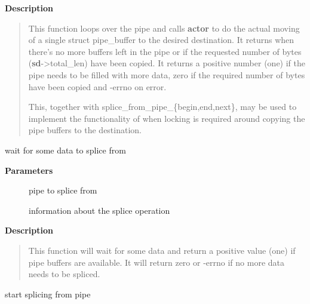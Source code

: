\documentclass[a4paper,8pt,english]{sphinxmanual}
\begin{document}
\textbf{Description}
\begin{quote}

This function loops over the pipe and calls \textbf{actor} to do the
actual moving of a single struct pipe\_buffer to the desired
destination.  It returns when there's no more buffers left in
the pipe or if the requested number of bytes (\textbf{sd}-\textgreater{}total\_len)
have been copied.  It returns a positive number (one) if the
pipe needs to be filled with more data, zero if the required
number of bytes have been copied and -errno on error.

This, together with splice\_from\_pipe\_\{begin,end,next\}, may be
used to implement the functionality of {\hyperref[filesystems/index:c.__splice_from_pipe]{\emph{}}} when
locking is required around copying the pipe buffers to the
destination.
\end{quote}

\begin{fulllineitems}
\label{filesystems/index:c.splice_from_pipe_next}
wait for some data to splice from

\end{fulllineitems}


\textbf{Parameters}
\begin{description}
\item[{}] \leavevmode
pipe to splice from

\item[{}] \leavevmode
information about the splice operation

\end{description}

\textbf{Description}
\begin{quote}

This function will wait for some data and return a positive
value (one) if pipe buffers are available.  It will return zero
or -errno if no more data needs to be spliced.
\end{quote}

\begin{fulllineitems}
\label{filesystems/index:c.splice_from_pipe_begin}
start splicing from pipe

\end{fulllineitems}
\end{document}
